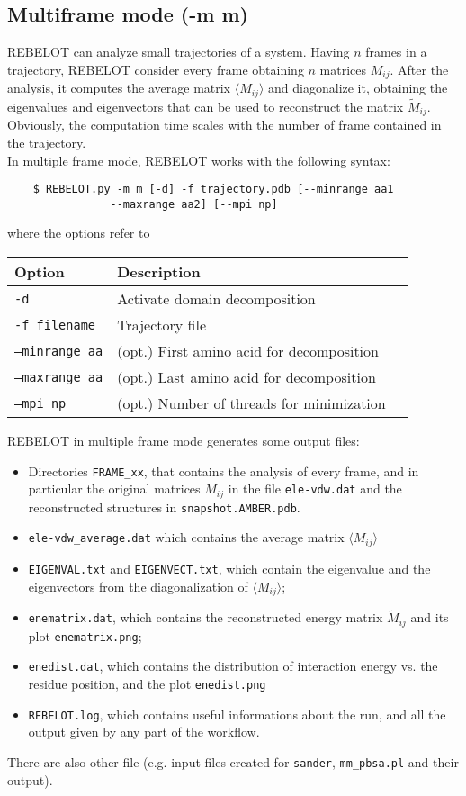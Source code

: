 \documentclass[a4paper,12pt]{book}
\begin{document}
\subsection{Multiframe mode (-m m)}
\label{sec32:multi}
REBELOT can analyze small trajectories of a system. Having $n$ frames in a trajectory, REBELOT consider every frame obtaining $n$ matrices $M_{ij}$. After the analysis, it computes the average matrix $\langle M_{ij} \rangle$ and diagonalize it, obtaining the eigenvalues and eigenvectors that can be used to reconstruct the matrix $\tilde{M}_{ij}$. Obviously, the computation time scales with the number of frame contained in the trajectory.\\
In multiple frame mode, REBELOT works with the following syntax:
\begin{lstlisting}
	$ REBELOT.py -m m [-d] -f trajectory.pdb [--minrange aa1 
				--maxrange aa2] [--mpi np]
\end{lstlisting}
where the options refer to
\begin{center}
\begin{tabular}{lll}
\toprule
Option & Description\\
\midrule
\texttt{-d}  & Activate domain decomposition \\
\texttt{-f filename}   & Trajectory file \\
\texttt{--minrange aa}  & (opt.) First amino acid for decomposition \\
\texttt{--maxrange aa}  & (opt.) Last amino acid for decomposition \\
\texttt{--mpi np}  & (opt.) Number of threads for minimization \\
\bottomrule
\end{tabular}
\end{center}
REBELOT in multiple frame mode generates some output files:
\begin{itemize}
	\item Directories \texttt{FRAME\_xx}, that contains the analysis of every frame, and in particular the original matrices $M_{ij}$ in the file \texttt{ele-vdw.dat} and the reconstructed structures in \texttt{snapshot.AMBER.pdb}.
	\item \texttt{ele-vdw\_average.dat} which contains the average matrix $\langle M_{ij} \rangle$
	\item \texttt{EIGENVAL.txt} and \texttt{EIGENVECT.txt}, which contain the eigenvalue and the eigenvectors from the diagonalization of $\langle M_{ij} \rangle$;
	\item \texttt{enematrix.dat}, which contains the reconstructed energy matrix $\tilde{M}_{ij}$ and its plot \texttt{enematrix.png};
	\item \texttt{enedist.dat}, which contains the distribution of interaction energy vs. the residue position, and the plot \texttt{enedist.png}
	\item \texttt{REBELOT.log}, which contains useful informations about the run, and all the output given by any part of the workflow.
\end{itemize}
There are also other file (e.g. input files created for \texttt{sander}, \texttt{mm\_pbsa.pl} and their output).
\end{document}
